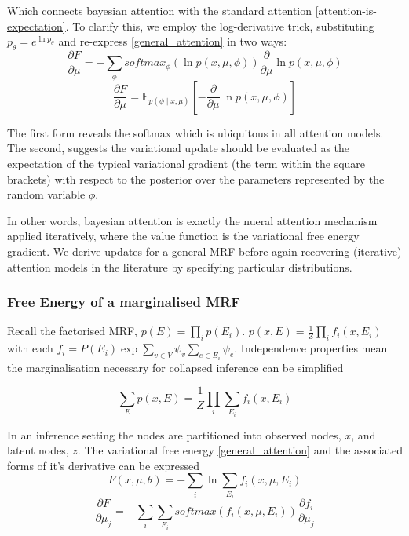 \documentclass{article}
\theoremstyle{plain}
\theoremstyle{definition}
\theoremstyle{remark}
\begin{document}
Which connects bayesian attention with the standard attention \eqref{attention-is-expectation}. To clarify this, we employ the log-derivative trick, substituting $p_\theta = e^{\ln p_\theta}$ and re-express \eqref{general_attention} in two ways:
\begin{equation}
    \frac{\partial F}{\partial \mu} = -\sum_{\phi} softmax_{\phi}(\ln p(x, \mu, \phi))\frac{\partial}{\partial \mu}\ln p(x, \mu, \phi) \label{softmax_derivative}
\end{equation}
\begin{equation}
    \frac{\partial F}{\partial \mu} = \mathbb{E}_{p(\phi \mid x, \mu)}[-\frac{\partial}{\partial \mu}\ln p(x, \mu, \phi)] \label{expected_attention}
\end{equation}

The first form reveals the softmax which is ubiquitous in all attention models. The second, suggests the variational update should be evaluated as the expectation of the  typical variational gradient (the term within the square brackets) with respect to the posterior over the parameters represented by the random variable $\phi$. 

In other words, bayesian attention is exactly the nueral attention mechanism applied iteratively, where the value function is the variational free energy gradient. We derive updates for a general MRF before again recovering (iterative) attention models in the literature  by specifying particular distributions. 


\subsubsection{Free Energy of a marginalised MRF}

Recall the factorised MRF, $p(E)= \prod_i p(E_i)$.  $p(x, E) = \frac{1}{Z} \prod_i f_i(x, E_i)$ with each $f_i =  P(E_i)\exp\sum_{v\in V}\psi_v{\sum_{e \in E_i}\psi_e}$. Independence properties mean the  marginalisation necessary for collapsed inference can be simplified

\begin{equation*}
        \sum_E p(x, E) = \frac{1}{Z}\prod_i \sum_{E_i} f_i(x, E_i)
\end{equation*}

In an inference setting the nodes are partitioned into observed nodes, $x$, and latent nodes, $z$. The variational free energy \eqref{general_attention} and the associated forms of it's derivative can be expressed  
\begin{equation*}  
    F(x, \mu, \theta) = - \sum_i\ln \sum_{E_i} f_i(x, \mu, E_i) 
\end{equation*}
$$\frac{\partial F}{\partial \mu_j} =  -\sum_i \sum_{E_i} softmax(f_i(x, \mu, E_i))\frac{\partial f_i}{\partial \mu_j}$$
\end{document}
